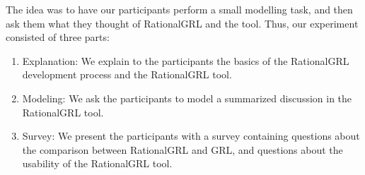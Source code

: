 The idea was to have our participants perform a small modelling task, and then ask them what they thought of RationalGRL and the tool. Thus, our experiment consisted of three parts:

\begin{enumerate}
\item Explanation: We explain to the participants the basics of the RationalGRL development process and the RationalGRL tool.
\item Modeling: We ask the participants to model a summarized discussion in the RationalGRL tool.
\item Survey: We present the participants with a survey containing questions about the comparison between RationalGRL and GRL, and questions about the usability of the RationalGRL tool.
\end{enumerate}


